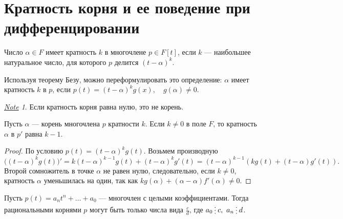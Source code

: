 \documentclass[11pt]{book}
\newcommand{\del}{{\:\small \raisebox{-2pt}{\vdots}\:}}
\theoremstyle{definition}
\theoremstyle{plain}
\theoremstyle{plain}
\theoremstyle{definition}
\theoremstyle{remark}
\newtheorem*{note}{\underline{Note}}
\begin{document}
\section{Кратность корня и ее поведение при дифференцировании}
\begin{defn}
    Число $ \alpha \in F$ {\sf имеет кратность $ k$ в многочлене}  $ p \in F[t]$, если $ k$ --- наибольшее натуральное число, для которого  $ p $ делится  $ (t - \alpha)^{k}$.

    Используя теорему Безу, можно переформулировать это определение: $ \alpha $ имеет кратность $ k$ в $p$, если  $ p(t) = (t-\alpha)^{k}g(x), \quad g(\alpha)\ne 0$.
\end{defn}
\begin{note}
    Если кратность корня равна нулю, это не корень.
\end{note}
\begin{thm}
    Пусть $ \alpha $ --- корень многочлена $ p$ кратности  $ k$.
    Если $ k \ne 0$ в поле $ F$, то кратность  $ \alpha $ в $ p'$ равна $ k-1$.
\end{thm}
\begin{proof}
    По условию $ p(t) = (t- \alpha )^{k}g(t)$.
    Возьмем производную
    $$  \bigl((t- \alpha ) ^{ k} g(t)\bigr)' = k (t - \alpha )^{k-1} g(t) + (t- \alpha ) ^{k} g'(t) = (t - \alpha ) ^{k-1} (k g(t) + (t - \alpha ) g'(t)).$$
    Второй сомножитель в точке $ \alpha $ не равен нулю, следовательно, если $ k \ne 0$, кратность $ \alpha $ уменьшилась на один, так как $ kg(\alpha) + (\alpha-\alpha)f'(\alpha) \ne 0$.
\end{proof}
\begin{thm}
    Пусть $ p(t) = a_n t ^{n} + \ldots  + a_0$ --- многочлен с целыми коэффициентами. Тогда рациональными корнями $ p$ могут быть только числа вида  $ \frac{c}{d}$, где $ a_0 \del c, ~ a_n \del d$.
\end{thm}
\end{document}
